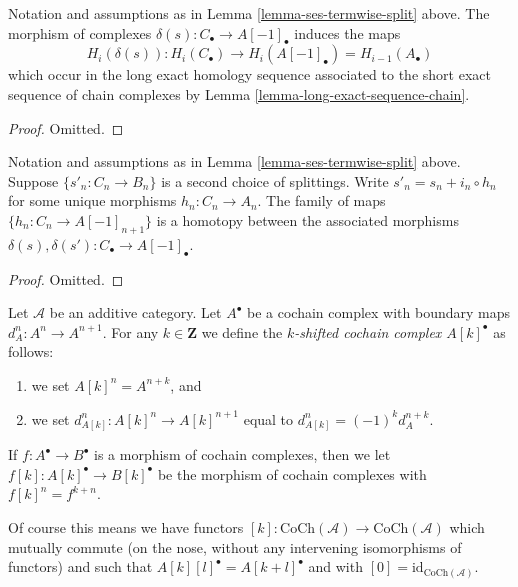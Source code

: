 \begin{lemma}
\label{lemma-ses-termwise-split-long}
Notation and assumptions as in Lemma \ref{lemma-ses-termwise-split} above.
The morphism of complexes $\delta(s) : C_\bullet \to A[-1]_\bullet$
induces the maps
$$
H_i(\delta(s)) :
H_i(C_\bullet) \longrightarrow H_i(A[-1]_\bullet) = H_{i - 1}(A_\bullet)
$$
which occur in the long exact homology sequence associated
to the short exact sequence of chain complexes by
Lemma \ref{lemma-long-exact-sequence-chain}.
\end{lemma}

\begin{proof}
Omitted.
\end{proof}

\begin{lemma}
\label{lemma-ses-termwise-split-homotopy}
Notation and assumptions as in Lemma \ref{lemma-ses-termwise-split} above.
Suppose $\{s'_n : C_n \to B_n\}$ is a second choice of splittings.
Write $s'_n = s_n + i_n \circ h_n$ for some unique
morphisms $h_n : C_n \to A_n$. The family of maps
$\{h_n : C_n \to A[-1]_{n + 1}\}$ is a homotopy between
the associated morphisms
$\delta(s), \delta(s') : C_\bullet \to A[-1]_\bullet$.
\end{lemma}

\begin{proof}
Omitted.
\end{proof}

\begin{definition}
\label{definition-shift-cochain}
Let $\mathcal{A}$ be an additive category.
Let $A^\bullet$ be a cochain complex
with boundary maps $d_A^n : A^n \to A^{n + 1}$.
For any $k \in \mathbf{Z}$ we define the
{\it $k$-shifted cochain complex $A[k]^\bullet$}
as follows:
\begin{enumerate}
\item we set $A[k]^n = A^{n + k}$, and
\item we set $d_{A[k]}^n : A[k]^n \to A[k]^{n + 1}$
equal to $d_{A[k]}^n = (-1)^k d_A^{n + k}$.
\end{enumerate}
If $f : A^\bullet \to B^\bullet$ is a morphism of
cochain complexes, then we let
$f[k] : A[k]^\bullet \to B[k]^\bullet$ be the
morphism of cochain complexes with
$f[k]^n = f^{k + n}$.
\end{definition}

\noindent
Of course this means we have functors
$[k] : \text{CoCh}(\mathcal{A}) \to \text{CoCh}(\mathcal{A})$
which mutually commute (on the nose, without
any intervening isomorphisms of functors) and
such that $A[k][l]^\bullet = A[k + l]^\bullet$ and
with $[0] = \text{id}_{\text{CoCh}(\mathcal{A})}$.

